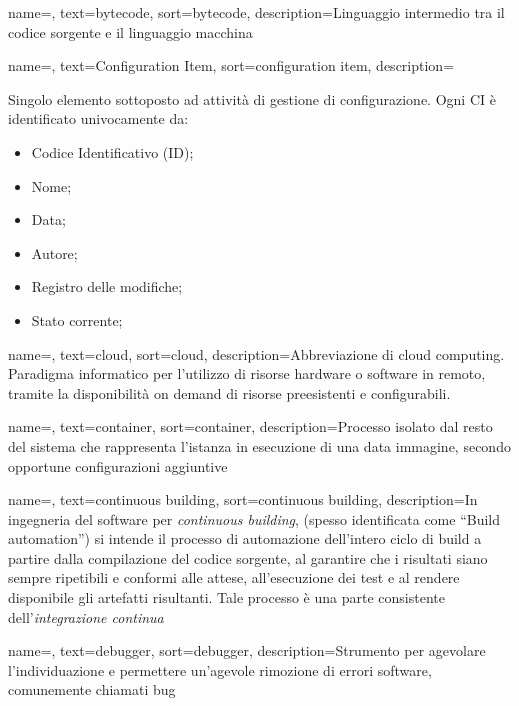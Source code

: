 {
    name=,
    text=bytecode,
    sort=bytecode,
    description={Linguaggio intermedio tra il codice sorgente e il linguaggio macchina}
}

{
    name=,
    text=Configuration Item,
    sort=configuration item,
    description={Singolo elemento sottoposto ad attività di gestione di configurazione. Ogni CI è identificato univocamente da:
        \begin{itemize}
            \item Codice Identificativo (ID);
            \item Nome;
            \item Data;
            \item Autore;
            \item Registro delle modifiche;
            \item Stato corrente;
        \end{itemize}}
}

{
    name=,
    text=cloud,
    sort=cloud,
    description={Abbreviazione di cloud computing. Paradigma informatico per l'utilizzo di risorse hardware o software in remoto, tramite la disponibilità on demand di risorse preesistenti e configurabili.}
}

{
    name=,
    text=container,
    sort=container,
    description={Processo isolato dal resto del sistema che rappresenta l'istanza in esecuzione di una data immagine, secondo opportune configurazioni aggiuntive}
}

{
    name=,
    text=continuous building,
    sort=continuous building,
    description={In ingegneria del software per \emph{continuous building}, (spesso identificata come ``Build automation'') si intende il processo di automazione dell'intero ciclo di build a partire dalla compilazione del codice sorgente, al garantire che i risultati siano sempre ripetibili e conformi alle attese, all'esecuzione dei test e al rendere disponibile gli artefatti risultanti. Tale processo è una parte consistente dell'\textit{integrazione continua}}
}

{
    name=,
    text=debugger,
    sort=debugger,
    description={Strumento per agevolare l'individuazione e permettere un'agevole rimozione di errori software, comunemente chiamati bug}
}

